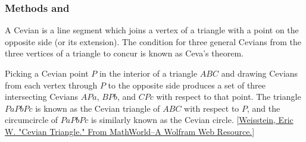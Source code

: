 
\subsubsection{Methods  and } %
\label{ssub:method_imeth_triangle_cevian}

A Cevian is a line segment which joins a vertex of a triangle with a point on the opposite side (or its extension). The condition for three general Cevians from the three vertices of a triangle to concur is known as Ceva's theorem.

Picking a Cevian point $P$ in the interior of a triangle $ABC$ and drawing Cevians from each vertex through $P$ to the opposite side produces a set of three intersecting Cevians $APa$, $BPb$, and $CPc$ with respect to that point. The triangle $PaPbPc$ is known as the Cevian triangle of $ABC$ with respect to $P$, and the circumcircle of $PaPbPc$ is similarly known as the Cevian circle. [\href{https://mathworld.wolfram.com/CevianTriangle.html}{Weisstein, Eric W. "Cevian Triangle." From MathWorld--A Wolfram Web Resource.}]


\vspace{6pt}

\begin{center}
\end{center}


